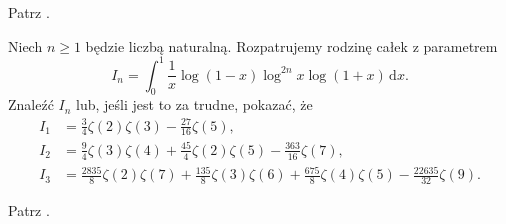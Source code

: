 \begin{solution} %
    Patrz \cite[s. 4, 5]{valean19}. %
\end{solution} %

\begin{problem}
    \label{valean_1_10}%
    Niech $n \ge 1$ będzie liczbą naturalną.
    Rozpatrujemy rodzinę całek z parametrem
    \begin{equation}
        I_n = \int_0^1 \frac 1 x \log(1-x) \log^{2n} x \log (1+x) \,\mathrm{d}x.
    \end{equation}
    Znaleźć $I_n$ lub, jeśli jest to za trudne, pokazać, że
    \begin{align}
        I_1 & = \frac 3 4 \zeta (2) \zeta (3) - \frac {27}{16} \zeta(5), \\
        I_2 & = \frac 9 4 \zeta (3) \zeta (4) + \frac{45}{4} \zeta(2) \zeta(5) - \frac{363}{16} \zeta (7), \\
        I_3 & = \frac{2835}{8} \zeta(2) \zeta (7) + \frac {135}{8} \zeta (3) \zeta (6) + \frac {675}{8} \zeta (4) \zeta (5) - \frac {22635}{32} \zeta (9).
    \end{align} 
\end{problem}

\begin{solution} %
    Patrz \cite[s. 6, 7]{valean19}. %
\end{solution} %

%